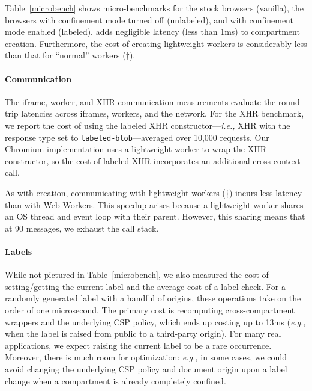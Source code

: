 Table~\ref{microbench} shows micro-benchmarks for the stock
browsers (vanilla), the \sys{} browsers with confinement mode turned
off (unlabeled), and with confinement mode enabled (labeled).
%
\sys{} adds negligible latency (less than 1ms) to compartment
creation.
%
Furthermore, the cost of creating lightweight workers is considerably
less than that for ``normal'' workers ($\dagger$).

\paragraph{Communication} The iframe, worker, and XHR communication measurements evaluate the
round-trip latencies across iframes, workers, and the network.
%
For the XHR benchmark, we report the cost of using the labeled XHR
constructor---\emph{i.e.,} XHR with the response type set to
\verb|labeled-blob|---averaged over 10,000 requests.
%
Our Chromium implementation uses a lightweight worker to wrap the XHR
constructor, so the cost of labeled XHR incorporates an additional
cross-context call.

As with creation, communicating with lightweight workers ($\ddagger$)
incurs less latency than with Web Workers.
%
This speedup arises because a lightweight worker shares
 an OS thread and event loop with their parent.
%
However, this sharing means that at 90 messages, we exhaust the call
stack.


\paragraph{Labels} While not pictured in Table~\ref{microbench},
we also measured the cost of setting/getting the current label and the
average cost of a label check.
%
For a randomly generated label with a handful of origins, these
operations take on the order of one microsecond.
%
The primary cost is recomputing cross-compartment wrappers and
the underlying CSP policy, which ends up costing up to 13ms (\emph{e.g.,} when
the label is raised from public to a third-party origin).
%
For many real applications, we expect raising the current label
to be a rare occurrence.
%
Moreover, there is much room for optimization: {\em e.g.,} in some cases,
we could avoid changing the underlying CSP policy and document
origin upon a label change when a compartment is already completely confined.
 
